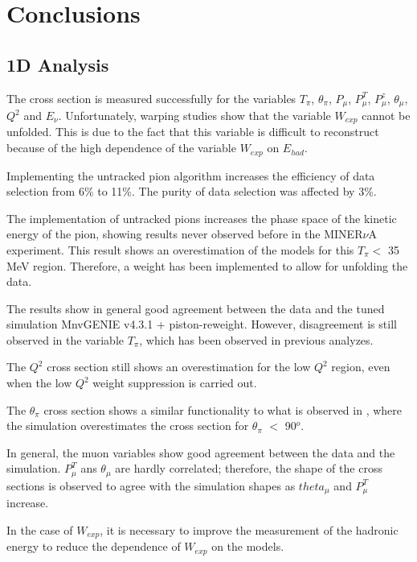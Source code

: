 \chapter{Conclusions}
\minitoc
\label{Cap:Conclusion}

\section{1D Analysis}
The cross section is measured successfully for the variables $T_\pi$, $\theta_\pi$, $P_\mu$, $P^T_\mu$, $P^z_\mu$, $\theta_\mu$, $Q^2$ and $E_\nu$. Unfortunately, warping studies show that the variable $W_{exp}$ cannot be unfolded. This is due to the fact that this variable is difficult to reconstruct because of the high dependence of the variable $W_{exp}$ on $E_{had}$. 

Implementing the untracked pion algorithm increases the efficiency of data selection from 6\% to 11\%. The purity of data selection was affected by 3\%.

The implementation of untracked pions increases the phase space of the kinetic energy of the pion, showing results never observed before in the MINER$\nu$A experiment. This result shows an overestimation of the models for this $T_\pi < $ 35 MeV region. Therefore, a weight has been implemented to allow for unfolding the data. 

The results show in general good agreement between the data and the tuned simulation MnvGENIE v4.3.1 + piston-reweight. However, disagreement is still observed in the variable $T_{\pi}$, which has been observed in previous analyzes.

The $Q^2$ cross section still shows an overestimation for the low $Q^2$ region, even when the low $Q^2$ weight suppression is carried out. 

The $\theta_\pi$ cross section shows a similar functionality to what is observed in \cite{Bercellie.131.011801}, where the simulation overestimates the cross section for $\theta_\pi$ $<$ 90$^o$. 

In general, the muon variables show good agreement between the data and the simulation. $P^T_\mu$ ans $\theta_\mu$ are hardly correlated; therefore, the shape of the cross sections is observed to agree with the simulation shapes as $theta_\mu$ and $P^T_\mu$ increase. 

In the case of $W_{exp}$, it is necessary to improve the measurement of the hadronic energy to reduce the dependence of $W_{exp}$ on the models. 

